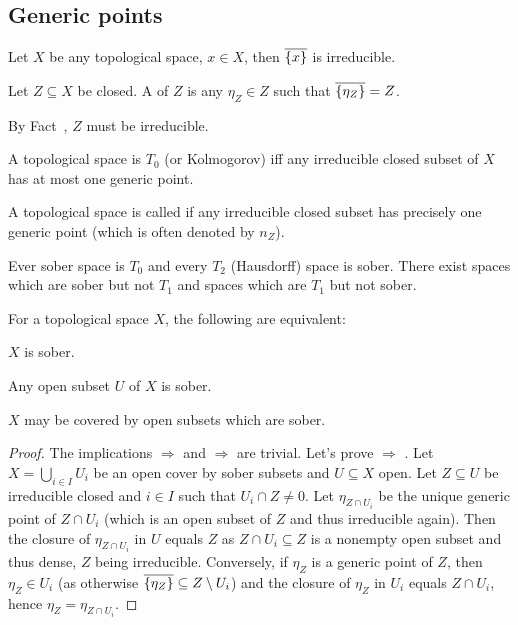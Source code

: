 \documentclass[a4paper,parskip=half,numbers=enddot, DIV=12]{scrreprt}
\begin{document}
\subsection{Generic points}

\begin{fact}
    Let $X$ be any topological space, $x\in X$, then $\overline{\{x\}}$ is irreducible.
\end{fact}
\begin{defi}
    Let $Z\subseteq X$ be closed. A  of $Z$ is any $\eta_Z\in Z$ such that $\overline{\{\eta_Z\}} = Z$.
\end{defi}
\begin{rem*}
    By Fact~, $Z$ must be irreducible.
\end{rem*}
\begin{fact}
    A topological space is $T_0$ (or Kolmogorov) iff any irreducible closed subset of $X$ has at most one generic point.
\end{fact}
\begin{defi} 
    A topological space is called  if any irreducible closed subset has precisely one generic point (which is often denoted by $n_Z$).
\end{defi}
\begin{rem*}
    Ever sober space is $T_0$ and every $T_2$ (Hausdorff) space is sober. There exist spaces which are sober but not $T_1$ and spaces which are $T_1$ but not sober.
\end{rem*}
\begin{fact}
    For a topological space $X$, the following are equivalent:
    \begin{alphanumerate}
    \item   
        $X$ is sober.
    \item 
        Any open subset $U$ of $X$ is sober.
    \item 
        $X$ may be covered by open subsets which are sober.
    \end{alphanumerate}
\end{fact}
\begin{proof}
	The implications  $\Rightarrow$  and  $\Rightarrow$  are trivial. Let's prove  $\Rightarrow$ . Let $X=\bigcup_{i\in I}U_i$ be an open cover by sober subsets and $U\subseteq X$ open. Let $Z\subseteq U$ be irreducible closed and $i\in I$ such that $U_i\cap Z\neq 0$. Let $\eta_{Z\cap U_i}$ be the unique generic point of $Z\cap U_i$ (which is an open subset of $Z$ and thus irreducible again). Then the closure of $\eta_{Z\cap U_i}$ in $U$ equals $Z$ as $Z\cap U_i\subseteq Z$ is a nonempty open subset and thus dense, $Z$ being irreducible. Conversely, if $\eta_Z$ is a generic point of $Z$, then $\eta_Z\in U_i$ (as otherwise $\overline{\{\eta_Z\}}\subseteq Z\setminus U_i$) and the closure of $\eta_Z$ in $U_i$ equals $Z\cap U_i$, hence $\eta_Z=\eta_{Z\cap U_i}$.
\end{proof}
\end{document}
